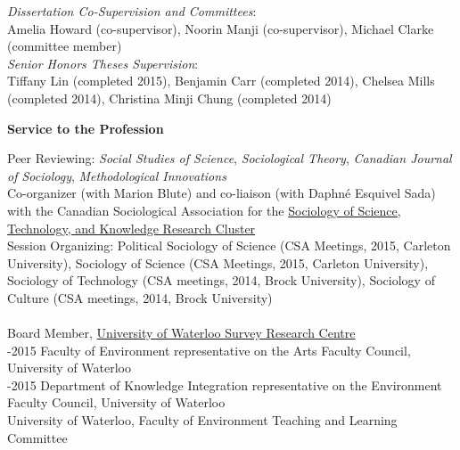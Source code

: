 \documentclass[9pt,usenames,dvipsnames]{article}
\begin{document}

\noindent \emph{Dissertation Co-Supervision and Committees}:  \\
\noindent Amelia Howard (co-supervisor), Noorin Manji (co-supervisor), Michael Clarke (committee member) \\

\noindent \emph{Senior Honors Theses Supervision}: \\
\noindent Tiffany Lin (completed 2015), Benjamin Carr (completed 2014), Chelsea Mills (completed 2014), Christina Minji Chung (completed 2014) \\


\ind \textbf{Service to the Profession}

\noindent Peer Reviewing: {\it Social Studies of Science}, {\it Sociological Theory}, {\it Canadian Journal of Sociology}, {\it Methodological Innovations}\\

\noindent Co-organizer (with Marion Blute) and co-liaison (with Daphné Esquivel Sada) with the Canadian Sociological Association for the \href{http://www.csa-scs.ca/files/webapps/csapress/sstk/}{Sociology of Science, Technology, and Knowledge Research Cluster}\\

\noindent Session Organizing: Political Sociology of Science (CSA Meetings, 2015, Carleton University), Sociology of Science (CSA Meetings, 2015, Carleton University), Sociology of Technology (CSA meetings, 2014, Brock University), Sociology of Culture (CSA meetings, 2014, Brock University) \\

 \\
 Board Member, \href{http://math.uwaterloo.ca/survey-research-centre/node/1}{University of Waterloo Survey Research Centre}  \\

-2015 Faculty of Environment representative on the Arts Faculty Council, University of Waterloo \\

-2015 Department of Knowledge Integration representative on the Environment Faculty Council, University of Waterloo \\

 University of Waterloo, Faculty of Environment Teaching and Learning Committee \\
\end{document}
